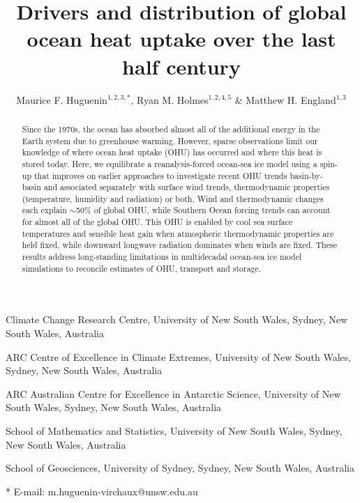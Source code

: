\documentclass{nature}
\title{Drivers and distribution of global ocean heat uptake over the last half century}
\author{Maurice F. Huguenin$^{1,2,3,*}$, Ryan M. Holmes$^{1,2,4,5}$ \& Matthew H. England$^{1,3}$}
\begin{document}
\maketitle
	\begin{affiliations}
		\item Climate Change Research Centre, University of New South Wales, Sydney, New South Wales, Australia
		\item ARC Centre of Excellence in Climate Extremes, University of New South Wales, Sydney, New South Wales, Australia
		\item ARC Australian Centre for Excellence in Antarctic Science, University of New South Wales, Sydney, New South Wales, Australia
		\item School of Mathematics and Statistics, University of New South Wales, Sydney, New South Wales, Australia
		\item School of Geosciences, University of Sydney, Sydney, New South Wales, Australia
		\item[*] E-mail: m.huguenin-virchaux@unsw.edu.au
	\end{affiliations}
	\begin{abstract}
		Since the 1970s, the ocean has absorbed almost all of the additional energy in the Earth system due to greenhouse warming. However, sparse observations limit our knowledge of where ocean heat uptake (OHU) has occurred and where this heat is stored today. Here, we equilibrate a reanalysis-forced ocean-sea ice model using a spin-up that improves on earlier approaches to investigate recent OHU trends basin-by-basin and associated separately with surface wind trends, thermodynamic properties (temperature, humidity and radiation) or both. Wind and thermodynamic changes each explain $\sim$50\% of global OHU, while Southern Ocean forcing trends can account for almost all of the global OHU. This OHU is enabled by cool sea surface temperatures and sensible heat gain when atmospheric thermodynamic properties are held fixed, while downward longwave radiation dominates when winds are fixed. These results address long-standing limitations in multidecadal ocean-sea ice model simulations to reconcile estimates of OHU, transport and storage.
	\end{abstract}\pagebreak
	
\end{document}
